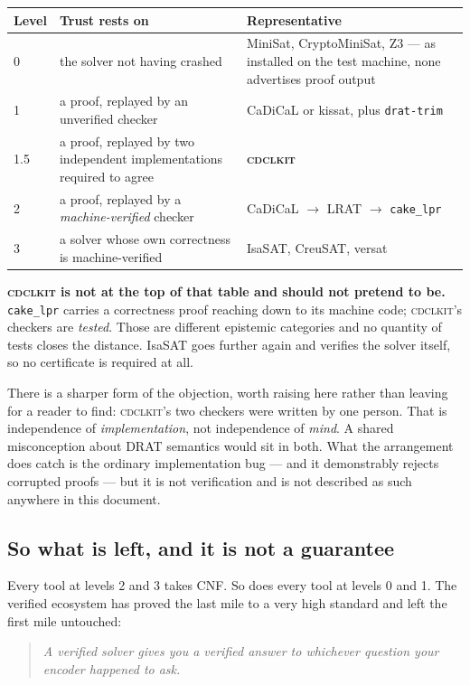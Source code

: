 \documentclass[11pt,a4paper]{article}
\newcommand{\cdclkit}{\textsc{cdclkit}}
\begin{document}
\begin{longtable}{p{0.9cm}p{6.3cm}p{6.6cm}}
\toprule
Level & Trust rests on & Representative \\
\midrule
\endhead
0 & the solver not having crashed & MiniSat, CryptoMiniSat, Z3 --- as installed
    on the test machine, none advertises proof output \\
1 & a proof, replayed by an unverified checker & CaDiCaL or kissat, plus
    \texttt{drat-trim} \\
1.5 & a proof, replayed by two independent implementations required to agree &
    \textbf{\cdclkit{}} \\
2 & a proof, replayed by a \emph{machine-verified} checker & CaDiCaL
    $\rightarrow$ LRAT $\rightarrow$ \texttt{cake\_lpr} \\
3 & a solver whose own correctness is machine-verified & IsaSAT, CreuSAT,
    versat \\
\bottomrule
\end{longtable}

\noindent
\textbf{\cdclkit{} is not at the top of that table and should not pretend to
be.} \texttt{cake\_lpr} carries a correctness proof reaching down to its
machine code; \cdclkit{}'s checkers are \emph{tested}. Those are different
epistemic categories and no quantity of tests closes the distance. IsaSAT goes
further again and verifies the solver itself, so no certificate is required at
all.

There is a sharper form of the objection, worth raising here rather than
leaving for a reader to find: \cdclkit{}'s two checkers were written by one
person. That is independence of \emph{implementation}, not independence of
\emph{mind}. A shared misconception about DRAT semantics would sit in both.
What the arrangement does catch is the ordinary implementation bug --- and it
demonstrably rejects corrupted proofs --- but it is not verification and is not
described as such anywhere in this document.

\subsection*{So what is left, and it is not a guarantee}

Every tool at levels 2 and 3 takes CNF. So does every tool at levels 0 and 1.
The verified ecosystem has proved the last mile to a very high standard and
left the first mile untouched:

\begin{quote}
\emph{A verified solver gives you a verified answer to whichever question your
encoder happened to ask.}
\end{quote}
\end{document}

